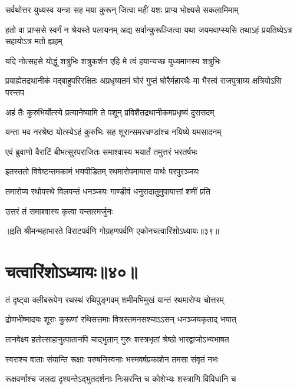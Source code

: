 \twolineshloka
{सर्वथोत्तर युध्यस्व यन्त्रा सह मया कुरून्}
{जित्वा महीं यशः प्राप्य भोक्ष्यसे सकलामिमाम्}


\onelineshloka
{हतो वा प्राप्ससे स्वर्गं न श्रेयस्ते पलायनम्}
\twolineshloka
{अद्य सर्वान्कुरूञ्जित्वा यथा जयमवाप्स्यसि}
{तथाऽहं प्रयतिष्येऽत्र सहायोऽत्र मतो ह्यहम्}


\twolineshloka
{यदि नोत्सहसे योद्धुं शत्रुभिः शत्रुकर्शन}
{एहि मे त्वं हयान्यच्छ युध्यमानस्य शत्रुभिः}


\threelineshloka
{प्रयाह्येतद्रथानीकं मद्बाहुपरिरक्षितः}
{अप्रधृष्यतमं घोरं गुप्तं घोरैर्महारथैः}
{मा भैस्त्वं राजपुत्राग्र्य क्षत्रियोऽसि परन्तप}


\twolineshloka
{अहं तैः कुरुभिर्योत्स्ये प्रत्यानेष्यामि ते पशून्}
{प्रविशैतद्रथानीकमप्रधृष्यं दुरासदम्}


\twolineshloka
{यन्ता भव नरश्रेष्ठ योत्स्येऽहं कुरुभिः सह}
{शूरान्समरचण्डांश्च नयिष्ये यमसादनम्}



\twolineshloka
{एवं ब्रुवाणो वैराटिं बीभत्सुरपराजितः}
{समाश्वास्य भयार्तं तमुत्तरं भरतर्षभः}


\twolineshloka
{इतस्ततो विवेष्टन्तमकामं भयपीडितम्}
{रथमारोपमायास पार्थः परपुरञ्जयः}


\twolineshloka
{तमारोप्य रथोपस्थे विलपन्तं धनञ्जयः}
{गाण्डीवं धनुरादातुमुपायात्तां शमीं प्रति}



\onelineshloka
{उत्तरं तं समाश्वास्य कृत्वा यन्तारमर्जुनः}


॥इति श्रीमन्महाभारते विराटपर्वणि गोग्रहणपर्वणि एकोनचत्वारिंशोऽध्यायः॥३९॥

\chapter{चत्वारिंशोऽध्यायः॥४०॥}

\twolineshloka
{तं दृष्ट्वा क्लीबरूपेण रथस्थं रथिपुङ्गवम्}
{शमीमभिमुखं यान्तं रथमारोप्य चोत्तरम्}


\twolineshloka
{द्रोणभीष्मादयः शूराः कुरूणां रथिसत्तमाः}
{वित्रस्तमनसश्चाऽऽसन् धनञ्जयकृताद् भयात्}


\twolineshloka
{तानवेक्ष्य हतोत्साहानुत्पातानपि चाद्भुतान्}
{गुरुः शस्त्रभृतां श्रेष्ठो भारद्वाजोऽभ्यभाषत}


\twolineshloka
{स्वराश्च वाताः संयान्ति रूक्षाः परुषनिस्वनाः}
{भस्मवर्षप्रकाशेन तमसा संवृतं नभः}


\twolineshloka
{रूक्षवर्णाश्च जलदा दृश्यन्तेऽद्भुतदर्शनाः}
{निःसरन्ति च कोशेभ्यः शस्त्राणि विविधानि च}


